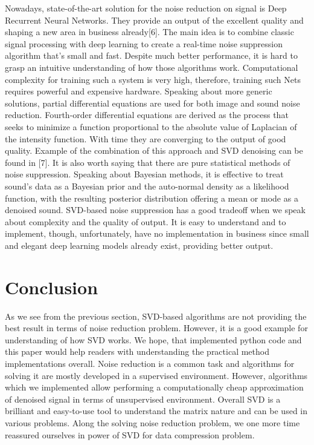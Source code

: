 Nowadays, state-of-the-art solution for the noise reduction on signal is Deep Recurrent Neural Networks. They provide an output of the excellent quality and shaping a new area in business already[6]. The main idea is to combine classic signal processing with deep learning to create a real-time noise suppression algorithm that's small and fast.
\newline
Despite much better performance, it is hard to grasp an intuitive understanding of how those algorithms work. Computational complexity for training such a system is very high, therefore, training such Nets requires powerful and expensive hardware.
\newline
Speaking about more generic solutions, partial differential equations are used for both image and sound noise reduction. Fourth-order differential equations are derived as the process that seeks to minimize a function proportional to the absolute value of Laplacian of the intensity function. With time they are converging to the output of good quality. Example of the combination of this approach and SVD denoising can be found in [7].
\newline 
It is also worth saying that there are pure statistical methods of noise suppression. Speaking about Bayesian methods, it is effective to treat sound's data as a Bayesian prior and the auto-normal density as a likelihood function, with the resulting posterior distribution offering a mean or mode as a denoised sound.
\newline
SVD-based noise suppression has a good tradeoff when we speak about complexity and the quality of output. It is easy to understand and to implement, though, unfortunately, have no implementation in business since small and elegant deep learning models already exist, providing better output.

\section{Conclusion}

As we see from the previous section, SVD-based algorithms are not providing the best result in terms of noise reduction problem. However, it is a good example for understanding of how SVD works. We hope, that implemented python code and this paper would help readers with understanding the practical method implementations overall.
\newline
Noise reduction is a common task and algorithms for solving it are mostly developed in a supervised environment. However, algorithms which we implemented allow performing a computationally cheap approximation of denoised signal in terms of unsupervised environment.
\newline
Overall SVD is a brilliant and easy-to-use tool to understand the matrix nature and can be used in various problems.
\newline
Along the solving noise reduction problem, we one more time reassured ourselves in power of SVD for data compression problem. 
\newpage


